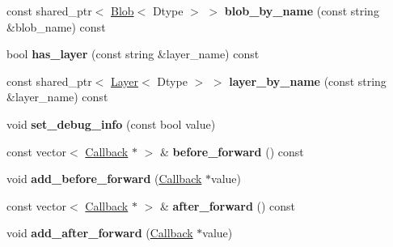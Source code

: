 \begin{DoxyCompactItemize}
\item 
const shared\+\_\+ptr$<$ \hyperlink{classcaffe_1_1Blob}{Blob}$<$ Dtype $>$ $>$ {\bfseries blob\+\_\+by\+\_\+name} (const string \&blob\+\_\+name) const \hypertarget{classcaffe_1_1Net_a4c34ad8290f7d4c49561de248b40932d}{}\label{classcaffe_1_1Net_a4c34ad8290f7d4c49561de248b40932d}

\item 
bool {\bfseries has\+\_\+layer} (const string \&layer\+\_\+name) const \hypertarget{classcaffe_1_1Net_a99628d3033e8bdaf89b112e8833ede33}{}\label{classcaffe_1_1Net_a99628d3033e8bdaf89b112e8833ede33}

\item 
const shared\+\_\+ptr$<$ \hyperlink{classcaffe_1_1Layer}{Layer}$<$ Dtype $>$ $>$ {\bfseries layer\+\_\+by\+\_\+name} (const string \&layer\+\_\+name) const \hypertarget{classcaffe_1_1Net_a335d5add79535fc37152511c65a9541c}{}\label{classcaffe_1_1Net_a335d5add79535fc37152511c65a9541c}

\item 
void {\bfseries set\+\_\+debug\+\_\+info} (const bool value)\hypertarget{classcaffe_1_1Net_a5b43ec32a7940703ecc3d0fa80bb2f91}{}\label{classcaffe_1_1Net_a5b43ec32a7940703ecc3d0fa80bb2f91}

\item 
const vector$<$ \hyperlink{classcaffe_1_1Net_1_1Callback}{Callback} $\ast$ $>$ \& {\bfseries before\+\_\+forward} () const \hypertarget{classcaffe_1_1Net_afa30838cbada873a838b65a2891f4671}{}\label{classcaffe_1_1Net_afa30838cbada873a838b65a2891f4671}

\item 
void {\bfseries add\+\_\+before\+\_\+forward} (\hyperlink{classcaffe_1_1Net_1_1Callback}{Callback} $\ast$value)\hypertarget{classcaffe_1_1Net_ab38efc0662826a18034817b484ea0b88}{}\label{classcaffe_1_1Net_ab38efc0662826a18034817b484ea0b88}

\item 
const vector$<$ \hyperlink{classcaffe_1_1Net_1_1Callback}{Callback} $\ast$ $>$ \& {\bfseries after\+\_\+forward} () const \hypertarget{classcaffe_1_1Net_ac81c6b5122fefbfea7d11e41fe2671d8}{}\label{classcaffe_1_1Net_ac81c6b5122fefbfea7d11e41fe2671d8}

\item 
void {\bfseries add\+\_\+after\+\_\+forward} (\hyperlink{classcaffe_1_1Net_1_1Callback}{Callback} $\ast$value)\hypertarget{classcaffe_1_1Net_a27f0234629c0131b23c577713bb8209e}{}\label{classcaffe_1_1Net_a27f0234629c0131b23c577713bb8209e}


\end{DoxyCompactItemize}
